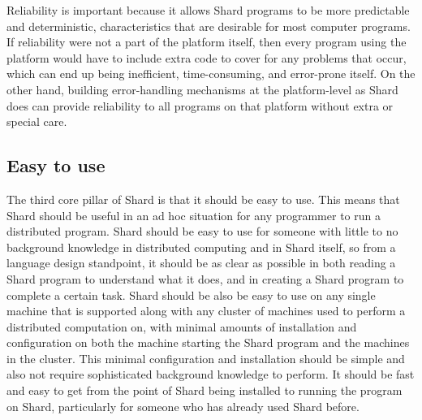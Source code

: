 \documentclass[oneside]{report}
\begin{document}
Reliability is important because it allows Shard programs to be more predictable and deterministic, characteristics that are desirable for most computer programs. If reliability were not a part of the platform itself, then every program using the platform would have to include extra code to cover for any problems that occur, which can end up being inefficient, time-consuming, and error-prone itself. On the other hand, building error-handling mechanisms at the platform-level as Shard does can provide reliability to all programs on that platform without extra or special care.

\subsection{Easy to use}

The third core pillar of Shard is that it should be easy to use.
This means that Shard should be useful in an ad hoc situation for any programmer to run a distributed program.
Shard should be easy to use for someone with little to no background knowledge in distributed computing and in Shard itself, so from a language design standpoint, it should be as clear as possible in both reading a Shard program to understand what it does, and in creating a Shard program to complete a certain task.
Shard should be also be easy to use on any single machine that is supported along with any cluster of machines used to perform a distributed computation on, with minimal amounts of installation and configuration on both the machine starting the Shard program and the machines in the cluster.
This minimal configuration and installation should be simple and also not require sophisticated background knowledge to perform.
It should be fast and easy to get from the point of Shard being installed to running the program on Shard, particularly for someone who has already used Shard before.
\end{document}
